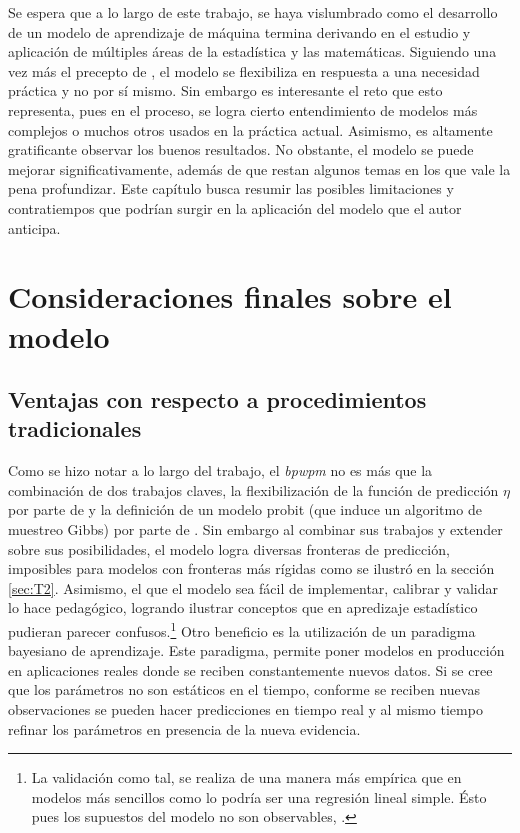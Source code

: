 \documentclass[../Main/Main.tex]{subfiles}
\begin{document}
Se espera que a lo largo de este trabajo, se haya vislumbrado como el desarrollo de un modelo de aprendizaje de máquina termina derivando en el estudio y aplicación de múltiples áreas de la estadística y las matemáticas. Siguiendo una vez más el precepto de \citet{box1976science}, el modelo se flexibiliza en respuesta a una necesidad práctica y no por sí mismo. Sin embargo es interesante el reto que esto representa, pues en el proceso, se logra cierto entendimiento de modelos más complejos o muchos otros usados en la práctica actual. Asimismo, es altamente gratificante observar los buenos resultados. No obstante, el modelo se puede mejorar significativamente, además de que restan algunos temas en los que vale la pena profundizar. Este capítulo busca resumir las posibles limitaciones y contratiempos que podrían surgir en la aplicación del modelo que el autor anticipa.

\section{Consideraciones finales sobre el modelo}
\subsection*{Ventajas con respecto a procedimientos tradicionales}
Como se hizo notar a lo largo del trabajo, el \textit{bpwpm} no es más que la combinación de dos trabajos claves, la flexibilización de la función de predicción $\eta$ por parte de \citet{mallik1998automatic} y la definición de un modelo probit (que induce un algoritmo de muestreo Gibbs) por parte de \citet{albert1993bayesian}. Sin embargo al combinar sus trabajos y extender sobre sus posibilidades, el modelo logra diversas fronteras de predicción, imposibles para modelos con fronteras más rígidas como se ilustró en la sección \ref{sec:T2}. Asimismo, el que el modelo sea fácil de implementar, calibrar y validar lo hace pedagógico, logrando ilustrar conceptos que en apredizaje estadístico pudieran parecer confusos.\footnote{La validación como tal, se realiza de una manera más empírica que en modelos más sencillos como lo podría ser una regresión lineal simple. Ésto pues los supuestos del modelo no son observables, \citet{draper1995assessment}.} Otro beneficio es la utilización de un paradigma bayesiano de aprendizaje. Este paradigma, permite poner modelos en producción en aplicaciones reales donde se reciben constantemente nuevos datos. Si se cree que los parámetros no son estáticos en el tiempo, conforme se reciben nuevas observaciones se pueden hacer predicciones en tiempo real y al mismo tiempo refinar los parámetros en presencia de la nueva evidencia.
\end{document}
